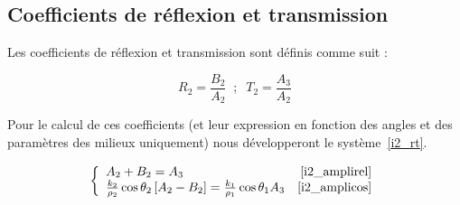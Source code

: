 \subsection{Coefficients de réflexion et transmission}

Les coefficients de réflexion et transmission sont définis comme suit :

$$R_2 = \frac{B_2}{A_2} \;\;;\;\; T_2 = \frac{A_3}{A_2}$$

Pour le calcul de ces coefficients (et leur expression en fonction des angles et des paramètres des milieux uniquement)
nous développeront le système~\eqref{i2_rt}.

\begin{eqnarray}
    \left\{\begin{array}{l r}
        A_2 + B_2  = A_3 & \eqref{i2_amplirel}\\
        \frac{k_2}{\rho_2}\cos\theta_2\left[A_2-B_2\right] = \frac{k_1}{\rho_1}\cos\theta_1A_3 & \eqref{i2_amplicos}
    \end{array}\right. \label{i2_rt}
\end{eqnarray}

